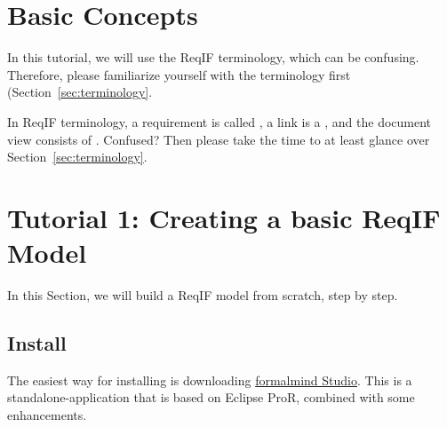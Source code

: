 % 

\section{Basic Concepts}

In this tutorial, we will use the ReqIF terminology, which can be confusing.  Therefore, please familiarize yourself with the terminology first (Section~\ref{sec:terminology}.

\begin{warning}
In ReqIF terminology, a requirement is called , a link is a , and the document view consists of .  Confused? Then please take the time to at least glance over Section~\ref{sec:terminology}.
\end{warning}

\section{Tutorial 1: Creating a basic ReqIF Model}

In this Section, we will build a ReqIF model from scratch, step by step.

\subsection{Install \pror{}}

The easiest way for installing \pror{} is downloading \href{http://formalmind.com/studio}{formalmind Stu\-dio}.  This is a standalone-application that is based on Eclipse ProR, combined with some enhancements.

